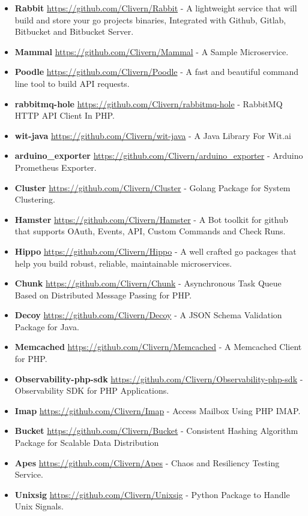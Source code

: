 \documentclass[paper=a4,fontsize=11pt]{scrartcl} %
\begin{document}
\begin{itemize}
\item \textbf{Rabbit} \url{https://github.com/Clivern/Rabbit} - A lightweight service that will build and store your go projects binaries, Integrated with Github, Gitlab, Bitbucket and Bitbucket Server.
\item \textbf{Mammal} \url{https://github.com/Clivern/Mammal} - A Sample Microservice.
\item \textbf{Poodle} \url{https://github.com/Clivern/Poodle} - A fast and beautiful command line tool to build API requests.
\item \textbf{rabbitmq-hole} \url{https://github.com/Clivern/rabbitmq-hole} - RabbitMQ HTTP API Client In PHP.
\item \textbf{wit-java} \url{https://github.com/Clivern/wit-java} - A Java Library For Wit.ai
\item \textbf{arduino\_exporter} \url{https://github.com/Clivern/arduino_exporter} - Arduino Prometheus Exporter.
\item \textbf{Cluster} \url{https://github.com/Clivern/Cluster} - Golang Package for System Clustering.
\item \textbf{Hamster} \url{https://github.com/Clivern/Hamster} - A Bot toolkit for github that supports OAuth, Events, API, Custom Commands and Check Runs.
\item \textbf{Hippo} \url{https://github.com/Clivern/Hippo} - A well crafted go packages that help you build robust, reliable, maintainable microservices.
\item \textbf{Chunk} \url{https://github.com/Clivern/Chunk} - Asynchronous Task Queue Based on Distributed Message Passing for PHP.
\item \textbf{Decoy} \url{https://github.com/Clivern/Decoy} - A JSON Schema Validation Package for Java.
\item \textbf{Memcached} \url{https://github.com/Clivern/Memcached} - A Memcached Client for PHP.
\item \textbf{Observability-php-sdk} \url{https://github.com/Clivern/Observability-php-sdk} - Observability SDK for PHP Applications.
\item \textbf{Imap} \url{https://github.com/Clivern/Imap} - Access Mailbox Using PHP IMAP.
\item \textbf{Bucket} \url{https://github.com/Clivern/Bucket} - Consistent Hashing Algorithm Package for Scalable Data Distribution
\item \textbf{Apes} \url{https://github.com/Clivern/Apes} - Chaos and Resiliency Testing Service.
\item \textbf{Unixsig} \url{https://github.com/Clivern/Unixsig} - Python Package to Handle Unix Signals.

\end{itemize}
\end{document}
